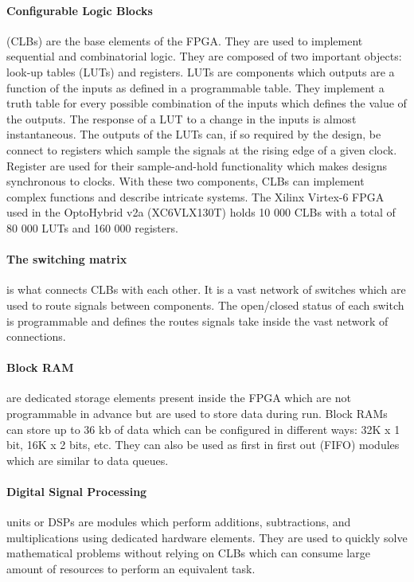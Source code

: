       \paragraph{Configurable Logic Blocks} (CLBs) are the base elements of the FPGA. They are used to implement sequential and combinatorial logic. They are composed of two important objects: look-up tables (LUTs) and registers. LUTs are components which outputs are a function of the inputs as defined in a programmable table. They implement a truth table for every possible combination of the inputs which defines the value of the outputs. The response of a LUT to a change in the inputs is almost instantaneous. The outputs of the LUTs can, if so required by the design, be connect to registers which sample the signals at the rising edge of a given clock. Register are used for their sample-and-hold functionality which makes designs synchronous to clocks. With these two components, CLBs can implement complex functions and describe intricate systems. The Xilinx Virtex-6 FPGA used in the OptoHybrid v2a (XC6VLX130T) holds 10 000 CLBs with a total of 80 000 LUTs and 160 000 registers.

      \paragraph{The switching matrix} is what connects CLBs with each other. It is a vast network of switches which are used to route signals between components. The open/closed status of each switch is programmable and defines the routes signals take inside the vast network of connections.

      \paragraph{Block RAM} are dedicated storage elements present inside the FPGA which are not programmable in advance but are used to store data during run. Block RAMs can store up to 36 kb of data which can be configured in different ways: 32K x 1 bit, 16K x 2 bits, etc. They can also be used as first in first out (FIFO) modules which are similar to data queues.

      \paragraph{Digital Signal Processing} units or DSPs are modules which perform additions, subtractions, and multiplications using dedicated hardware elements. They are used to quickly solve mathematical problems without relying on CLBs which can consume large amount of resources to perform an equivalent task.

